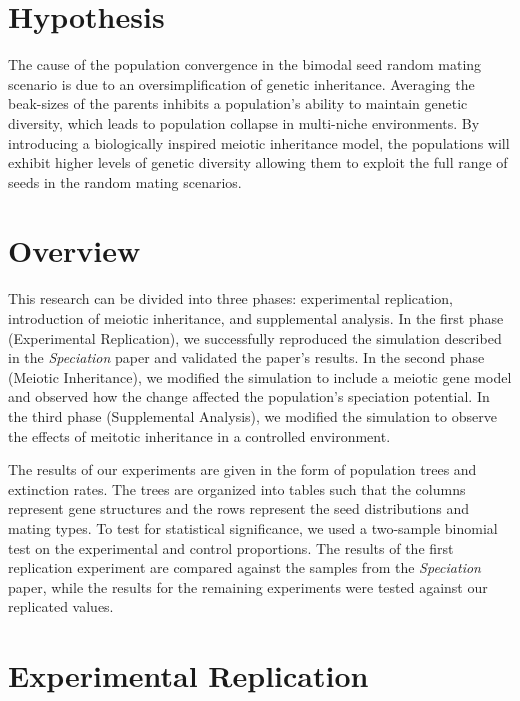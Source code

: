 \documentclass{article}
\begin{document}
\section{Hypothesis}

The cause of the population convergence in the bimodal seed random mating scenario is due to an oversimplification of genetic inheritance. Averaging the beak-sizes of the parents inhibits a population’s ability to maintain genetic diversity, which leads to population collapse in multi-niche environments. By introducing a biologically inspired meiotic inheritance model, the populations will exhibit higher levels of genetic diversity allowing them to exploit the full range of seeds in the random mating scenarios. 



\section{Overview}

This research can be divided into three phases: experimental replication, introduction of meiotic inheritance, and supplemental analysis. In the first phase (Experimental Replication), we successfully reproduced the simulation described in the \textit{Speciation} paper and validated the paper's results. In the second phase (Meiotic Inheritance), we modified the simulation to include a meiotic gene model and observed how the change affected the population's speciation potential. In the third phase (Supplemental Analysis), we modified the simulation to observe the effects of meitotic inheritance in a controlled environment. 

The results of our experiments are given in the form of population trees and extinction rates. The trees are organized into tables such that the columns represent gene structures and the rows represent the seed distributions and mating types. To test for statistical significance, we used a two-sample binomial test on the experimental and control proportions. The results of the first replication experiment are compared against the samples from the \textit{Speciation} paper, while the results for the remaining experiments were tested against our replicated values. 



\section{Experimental Replication}
\end{document}
